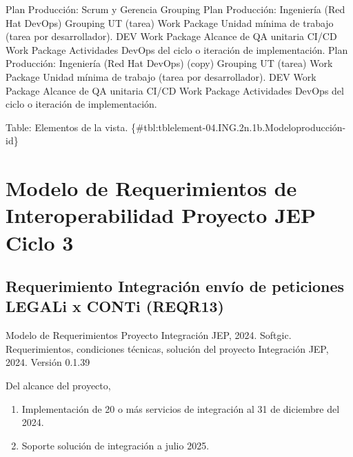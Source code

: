 \documentclass[
  paper=a4,
  ,captions=tableheading
]{scrartcl}
\providecommand{\tightlist}{%
  \setlength{\itemsep}{0pt}\setlength{\parskip}{0pt}}
\renewenvironment{quote}{\begin{customblockquote}\list{}{\rightmargin=0em\leftmargin=0em}%
\item\relax\color{blockquote-text}\ignorespaces}{\unskip\unskip\endlist\end{customblockquote}}
\begin{document}
\textbar{} \textbar{} Plan Producción: Scrum y Gerencia \textbar{}
Grouping \textbar{} \textbar{} \textbar{} Plan Producción: Ingeniería
(Red Hat DevOps) \textbar{} Grouping \textbar{} \textbar{} \textbar{} UT
(tarea) \textbar{} Work Package \textbar{} Unidad mínima de trabajo
(tarea por desarrollador). \textbar{} \textbar{} DEV \textbar{} Work
Package \textbar{} Alcance de QA unitaria \textbar{} \textbar{} CI/CD
\textbar{} Work Package \textbar{} Actividades DevOps del ciclo o
iteración de implementación. \textbar{} \textbar{} Plan Producción:
Ingeniería (Red Hat DevOps) (copy) \textbar{} Grouping \textbar{}
\textbar{} \textbar{} UT (tarea) \textbar{} Work Package \textbar{}
Unidad mínima de trabajo (tarea por desarrollador). \textbar{}
\textbar{} DEV \textbar{} Work Package \textbar{} Alcance de QA unitaria
\textbar{} \textbar{} CI/CD \textbar{} Work Package \textbar{}
Actividades DevOps del ciclo o iteración de implementación. \textbar{}

Table: Elementos de la vista.
\{\#tbl:tblelement-04.ING.2n.1b.Modeloproducción-id\}

\newpage

\section{Modelo de Requerimientos de Interoperabilidad Proyecto JEP
Ciclo
3}\label{sec:modelo-de-requerimientos-de-interoperabilidad-proyecto-jep-ciclo-3}

\subsection{Requerimiento Integración envío de peticiones LEGALi x CONTi
(REQR13)}\label{sec:requerimiento-integraciuxf3n-envuxedo-de-peticiones-legali-x-conti-reqr13}

\begin{quote}
Modelo de Requerimientos Proyecto Integración JEP, 2024. Softgic.
Requerimientos, condiciones técnicas, solución del proyecto Integración
JEP, 2024. Versión 0.1.39
\end{quote}

Del alcance del proyecto,

\begin{enumerate}
\def\labelenumi{\arabic{enumi}.}
\tightlist
\item
  Implementación de 20 o más servicios de integración al 31 de diciembre
  del 2024.
\item
  Soporte solución de integración a julio 2025.
\end{enumerate}
\end{document}
